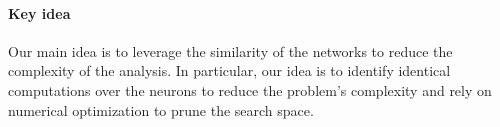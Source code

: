 

%

\paragraph{Key idea}
Our main idea is to leverage the similarity of the networks to reduce the complexity of the analysis. In particular, our idea is to identify identical computations over the neurons to reduce the problem's complexity and rely on numerical optimization to prune the search space. %

